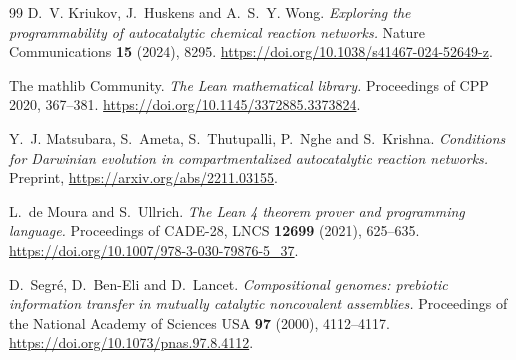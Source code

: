 \documentclass[11pt]{article}
\theoremstyle{plain}
\theoremstyle{definition}
\theoremstyle{remark}
\begin{document}
\begin{thebibliography}{99}
D.~V. Kriukov, J.~Huskens and A.~S.~Y. Wong.
\emph{Exploring the programmability of autocatalytic chemical reaction
networks.}
Nature Communications \textbf{15} (2024), 8295.
\url{https://doi.org/10.1038/s41467-024-52649-z}.

The mathlib Community.
\emph{The Lean mathematical library.}
Proceedings of CPP 2020, 367--381.
\url{https://doi.org/10.1145/3372885.3373824}.

Y.~J. Matsubara, S.~Ameta, S.~Thutupalli, P.~Nghe and S.~Krishna.
\emph{Conditions for Darwinian evolution in compartmentalized autocatalytic
reaction networks.}
Preprint, \url{https://arxiv.org/abs/2211.03155}.

L.~de Moura and S.~Ullrich.
\emph{The Lean 4 theorem prover and programming language.}
Proceedings of CADE-28, LNCS \textbf{12699} (2021), 625--635.
\url{https://doi.org/10.1007/978-3-030-79876-5_37}.

D.~Segr\'e, D.~Ben-Eli and D.~Lancet.
\emph{Compositional genomes: prebiotic information transfer in mutually
catalytic noncovalent assemblies.}
Proceedings of the National Academy of Sciences USA \textbf{97} (2000),
4112--4117.
\url{https://doi.org/10.1073/pnas.97.8.4112}.

\end{thebibliography}
\end{document}

